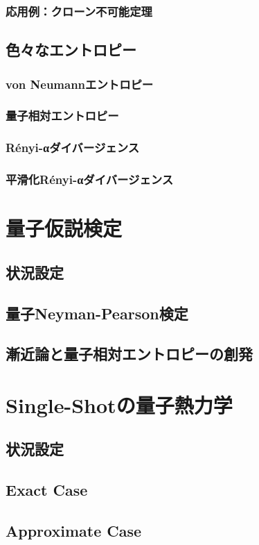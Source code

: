 \documentclass[report]{jlreq}
\begin{document}
\subsection{応用例：クローン不可能定理}
\section{色々なエントロピー}
\subsection{von Neumannエントロピー}
\subsection{量子相対エントロピー}
\subsection{R\'{e}nyi-αダイバージェンス}
\subsection{平滑化R\'{e}nyi-αダイバージェンス}

\chapter{量子仮説検定}
\section{状況設定}
\section{量子Neyman-Pearson検定}
\section{漸近論と量子相対エントロピーの創発}

\chapter{Single-Shotの量子熱力学}
\section{状況設定}
\section{Exact Case}
\section{Approximate Case}
\end{document}
